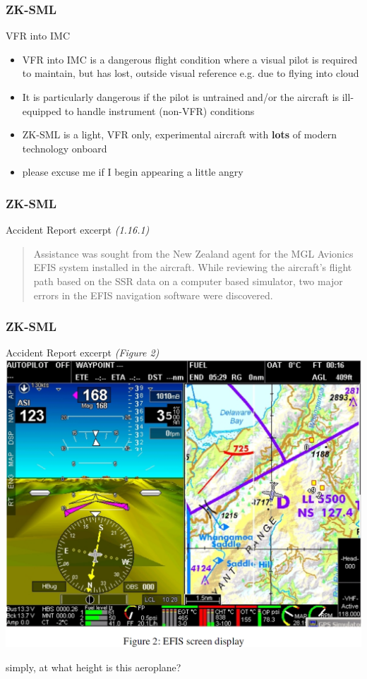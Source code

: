 \begin{frame}
\frametitle{ZK-SML}
\begin{block}{VFR into IMC}
\begin{itemize}
\item<1-> VFR into IMC is a dangerous flight condition where a visual pilot is required to maintain, but has lost, outside visual reference e.g. due to flying into cloud
\item<2-> It is particularly dangerous if the pilot is untrained and/or the aircraft is ill-equipped to handle instrument (non-VFR) conditions
\item<3-> ZK-SML is a light, VFR only, experimental aircraft with \textbf{lots} of modern technology onboard
\item<4-> \tiny{please excuse me if I begin appearing a little angry}
\end{itemize}
\end{block}
\end{frame}

\begin{frame}
\frametitle{ZK-SML}
\begin{block}{Accident Report excerpt \tiny{\emph{(1.16.1)}}}
\begin{quote}
Assistance was sought from the New Zealand agent for the MGL Avionics EFIS system installed in the aircraft.  While reviewing the aircraft's flight path based on the SSR data on a computer based simulator, two major errors in the EFIS navigation software were discovered. 
\end{quote}
\end{block}
\end{frame}

\begin{frame}
\frametitle{ZK-SML}
\begin{block}{Accident Report excerpt \tiny{\emph{(Figure 2)}}}
\includegraphics[height=0.7\textheight]{image/zk-sml-map.png}
\end{block}
\tiny{simply, at what height is this aeroplane?}
\end{frame}

